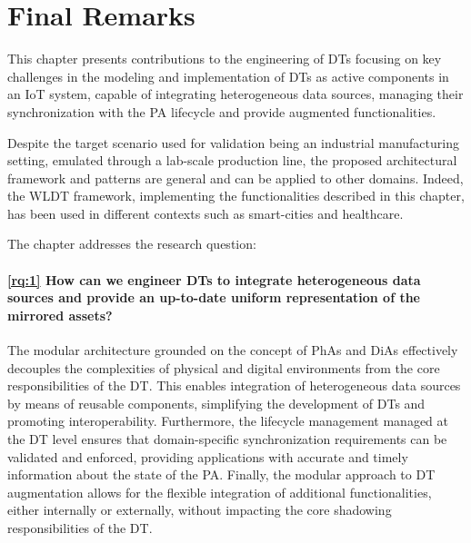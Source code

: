 \section{Final Remarks}

This chapter presents contributions to the engineering of \acp{DT} focusing on key challenges in the modeling and implementation of \acp{DT} as active components in an \ac{IoT} system, capable of integrating heterogeneous data sources, managing their synchronization with the \ac{PA} lifecycle and provide augmented functionalities. 

Despite the target scenario used for validation being an industrial manufacturing setting, emulated through a lab-scale production line, the proposed architectural framework and patterns are general and can be applied to other domains.
%
Indeed, the \ac{WLDT} framework, implementing the functionalities described in this chapter, has been used in different contexts such as smart-cities and healthcare. 

The chapter addresses the research question:

\paragraph{\ref{rq:1} How can we engineer \acp{DT} to integrate heterogeneous data sources and provide an up-to-date uniform representation of the mirrored assets?}
%
The modular architecture grounded on the concept of \acp{PhA} and \acp{DiA} effectively decouples the complexities of physical and digital environments from the core responsibilities of the \ac{DT}.
%
This enables integration of heterogeneous data sources by means of reusable components, simplifying the development of \acp{DT} and promoting interoperability.
%
Furthermore, the lifecycle management managed at the \ac{DT} level ensures that domain-specific synchronization requirements can be validated and enforced, providing applications with accurate and timely information about the state of the \ac{PA}.
%
Finally, the modular approach to \ac{DT} augmentation allows for the flexible integration of additional functionalities, either internally or externally, without impacting the core shadowing responsibilities of the \ac{DT}.
